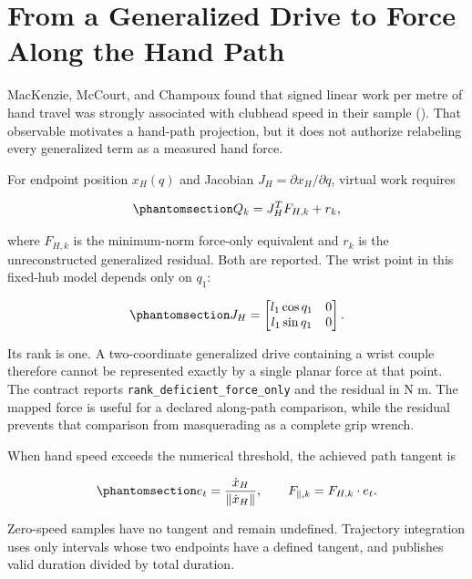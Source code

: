 \documentclass[
  letterpaper,
]{report}
\begin{document}
\section{From a Generalized Drive to Force Along the Hand
Path}\label{sec-source-hand-path-map}

MacKenzie, McCourt, and Champoux found that signed linear work per metre
of hand travel was strongly associated with clubhead speed in their
sample (). That observable motivates a hand-path projection, but
it does not authorize relabeling every generalized term as a measured
hand force.

For endpoint position \(x_H(q)\) and Jacobian
\(J_H=\partial x_H/\partial q\), virtual work requires

\begin{equation}\phantomsection\label{eq-source-virtual-work}{
Q_k=J_H^T F_{H,k}+r_k,
}\end{equation}

where \(F_{H,k}\) is the minimum-norm force-only equivalent and \(r_k\)
is the unreconstructed generalized residual. Both are reported. The
wrist point in this fixed-hub model depends only on \(q_1\):

\begin{equation}\phantomsection\label{eq-source-wrist-jacobian}{
J_H=
\begin{bmatrix}
l_1\cos q_1&0\\
l_1\sin q_1&0
\end{bmatrix}.
}\end{equation}

Its rank is one. A two-coordinate generalized drive containing a wrist
couple therefore cannot be represented exactly by a single planar force
at that point. The contract reports
\texttt{rank\_deficient\_force\_only} and the residual in N m. The
mapped force is useful for a declared along-path comparison, while the
residual prevents that comparison from masquerading as a complete grip
wrench.

When hand speed exceeds the numerical threshold, the achieved path
tangent is

\begin{equation}\phantomsection\label{eq-source-tangent}{
e_t=\frac{\dot x_H}{\lVert\dot x_H\rVert},
\qquad F_{\parallel,k}=F_{H,k}\cdot e_t.
}\end{equation}

Zero-speed samples have no tangent and remain undefined. Trajectory
integration uses only intervals whose two endpoints have a defined
tangent, and publishes valid duration divided by total duration.
\end{document}
